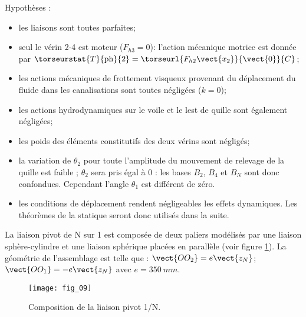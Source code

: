 Hypothèses :
\begin{itemize}
\item les liaisons sont toutes parfaites;
\item seul le vérin 2-4 est moteur ($F_{h3}=0$): l’action mécanique motrice est donnée par $\torseurstat{T}{\text{ph}}{2} = \torseurl{F_{h2}\vect{x_2}}{\vect{0}}{C}$;
\item les actions mécaniques de frottement visqueux provenant du déplacement du fluide dans les canalisations sont toutes négligées ($k=0$);
\item les actions hydrodynamiques sur le voile et le lest de quille sont également négligées;
\item les poids des éléments constitutifs des deux vérins sont négligés;
\item la variation de $\theta_2$ pour toute l’amplitude du mouvement de relevage de la quille est faible ; $\theta_2$ sera pris égal à 0 : les bases $B_2$,  $B_4$ et $B_N$ sont donc confondues. Cependant l’angle $\theta_1$ est différent de zéro.
\item les conditions de déplacement rendent négligeables les effets dynamiques. Les théorèmes de la statique seront donc utilisés dans la suite.
\end{itemize}



La liaison pivot de N sur 1 est composée de deux paliers modélisés par une liaison sphère-cylindre et une liaison sphérique placées en parallèle (voir figure \ref{fig_09_quille}). La géométrie de l’assemblage est telle que : $\vect{OO_2}=e\vect{z_N}$; $\vect{OO_1}=-e\vect{z_N}$ avec $e=\SI{350}{mm}$.

\begin{figure}[!h]
\centering
\texttt{[image: fig\_09]}
\caption{Composition de la liaison pivot 1/N. \label{fig_09_quille}}
\end{figure}





